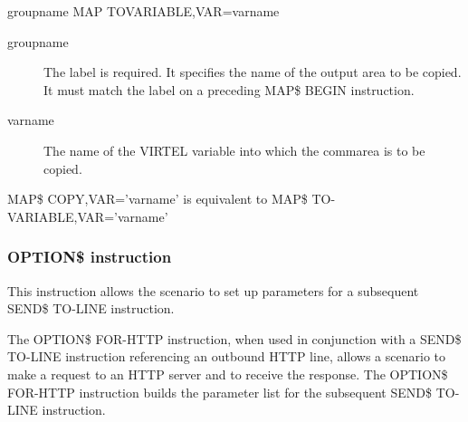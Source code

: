\documentclass[letterpaper,10pt,english]{sphinxmanual}
\begin{document}
\begin{sphinxVerbatim}[commandchars=\\\{\}]
groupname MAP\PYGZdl{} TO\PYGZhy{}VARIABLE,VAR=\PYGZsq{}varname\PYGZsq{}
\end{sphinxVerbatim}
\begin{description}
\item[{groupname}] \leavevmode
The label is required. It specifies the name of the output area to be copied. It must match the label on a preceding MAP\$ BEGIN instruction.

\item[{varname}] \leavevmode
The name of the VIRTEL variable into which the commarea is to be copied.

\end{description}

MAP\$ COPY,VAR=’varname’ is equivalent to MAP\$ TO-VARIABLE,VAR=’varname’


\subsubsection{OPTION\$ instruction}
\label{\detokenize{User_Guide:v457ug-option}}\label{\detokenize{User_Guide:option-instruction}}
This instruction allows the scenario to set up parameters for a subsequent SEND\$ TO-LINE instruction.


The OPTION\$ FOR-HTTP instruction, when used in conjunction with a SEND\$ TO-LINE instruction referencing an outbound HTTP line, allows a scenario to make a request to an HTTP server and to receive the response. The OPTION\$ FOR-HTTP instruction builds the parameter list for the subsequent SEND\$ TO-LINE instruction.
\end{document}
